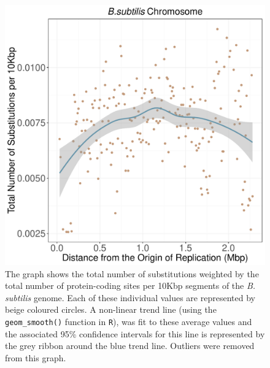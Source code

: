 \documentclass[11pt]{article}
\newcommand{\bass}{\textit{B.\,subtilis}\xspace}
\begin{document}
\begin{figure}[h]
	\begin{center}
		\includegraphics[width=\textwidth]{./figs/bass_10KB_weighted_subs_nonpar_22Sep20.pdf}
		\caption{\label{fig:bass_nonpar}The graph shows the total number of substitutions weighted by the total number of protein-coding sites per 10Kbp segments of the \bass genome. Each of these individual values are represented by beige coloured circles. A non-linear trend line (using the \texttt{geom\_smooth()} function in \texttt{R}), was fit to these average values and the associated 95\% confidence intervals for this line is represented by the grey ribbon around the blue trend line. Outliers were removed from this graph.}
	\end{center}
\end{figure}
\end{document}
